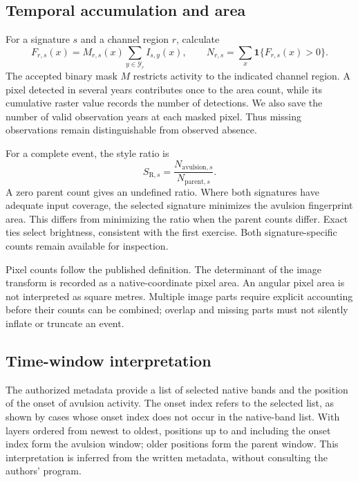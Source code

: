 \documentclass[11pt]{article}
\begin{document}
\subsection{Temporal accumulation and area}
For a signature $s$ and a channel region $r$, calculate
\begin{equation}
 F_{r,s}(x)=M_{r,s}(x)\sum_{y\in\mathcal{Y}_r} I_{s,y}(x),\qquad
 N_{r,s}=\sum_x\mathbf{1}\{F_{r,s}(x)>0\}.
\end{equation}
The accepted binary mask $M$ restricts activity to the indicated channel
region. A pixel detected in several years contributes once to the area
count, while its cumulative raster value records the number of detections.
We also save the number of valid observation years at each masked pixel.
Thus missing observations remain distinguishable from observed absence.

For a complete event, the style ratio is
\begin{equation}
 S_{\mathrm R,s}=\frac{N_{\mathrm{avulsion},s}}{N_{\mathrm{parent},s}}.
\end{equation}
A zero parent count gives an undefined ratio. Where both signatures have
adequate input coverage, the selected signature minimizes the avulsion
fingerprint area. This differs from minimizing the ratio when the parent
counts differ. Exact ties select brightness, consistent with the first
exercise. Both signature-specific counts remain available for inspection.

Pixel counts follow the published definition. The determinant of the image
transform is recorded as a native-coordinate pixel area. An angular pixel
area is not interpreted as square metres. Multiple image parts require
explicit accounting before their counts can be combined; overlap and missing
parts must not silently inflate or truncate an event.

\subsection{Time-window interpretation}
The authorized metadata provide a list of selected native bands and the
position of the onset of avulsion activity. The onset index refers to the
selected list, as shown by cases whose onset index does not occur in the
native-band list. With layers ordered from newest to oldest, positions up
to and including the onset index form the avulsion window; older positions
form the parent window. This interpretation is inferred from the written
metadata, without consulting the authors' program.
\end{document}
